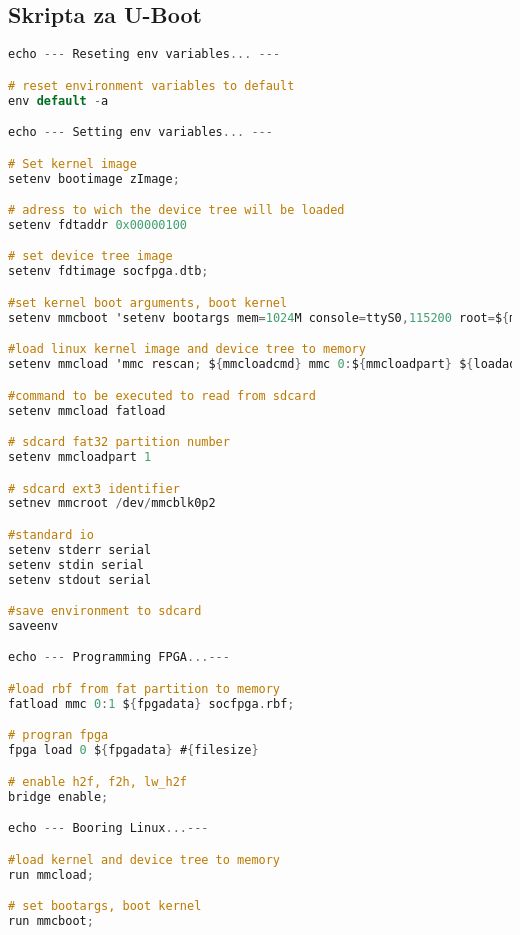 \subsection{Skripta za U-Boot}
\begin{lstlisting}[language=C]
echo --- Reseting env variables... ---

# reset environment variables to default
env default -a

echo --- Setting env variables... ---

# Set kernel image
setenv bootimage zImage;

# adress to wich the device tree will be loaded
setenv fdtaddr 0x00000100

# set device tree image
setenv fdtimage socfpga.dtb;

#set kernel boot arguments, boot kernel
setenv mmcboot 'setenv bootargs mem=1024M console=ttyS0,115200 root=${mmcroot} rw rootwait; bootz ${loadaddr} - ${ftdaddr}';

#load linux kernel image and device tree to memory
setenv mmcload 'mmc rescan; ${mmcloadcmd} mmc 0:${mmcloadpart} ${loadaddr} ${bootimage}; ${mmcloadcmd} mmc 0:${mmcloadpart} ${fdtaddr} ${fdtimage}'

#command to be executed to read from sdcard
setenv mmcload fatload

# sdcard fat32 partition number
setenv mmcloadpart 1

# sdcard ext3 identifier
setnev mmcroot /dev/mmcblk0p2

#standard io
setenv stderr serial
setenv stdin serial
setenv stdout serial

#save environment to sdcard
saveenv

echo --- Programming FPGA...---

#load rbf from fat partition to memory
fatload mmc 0:1 ${fpgadata} socfpga.rbf;

# progran fpga
fpga load 0 ${fpgadata} #{filesize}

# enable h2f, f2h, lw_h2f
bridge enable;

echo --- Booring Linux...---

#load kernel and device tree to memory
run mmcload;

# set bootargs, boot kernel
run mmcboot;
\end{lstlisting}